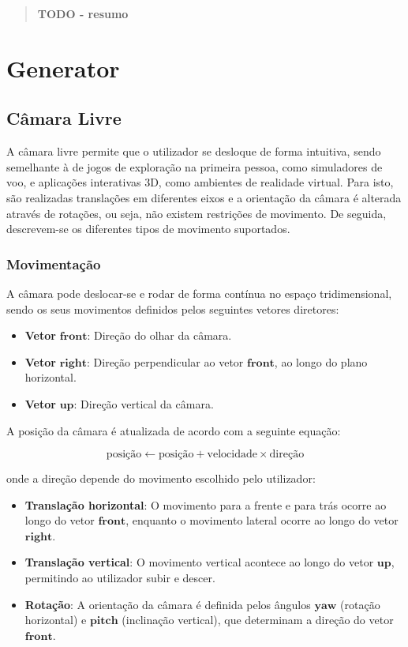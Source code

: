 \documentclass[12pt, a4paper]{article}
\begin{document}
\pagebreak

\begin{abstract}
    \textbf{\color{red} TODO - resumo}
\end{abstract}

\section{Generator}

\subsection{Câmara Livre}

A câmara livre permite que o utilizador se desloque de forma intuitiva, sendo semelhante à de
jogos de exploração na primeira pessoa, como simuladores de voo, e aplicações interativas 3D,
como ambientes de realidade virtual. Para isto, são realizadas translações em diferentes eixos
e a orientação da câmara é alterada através de rotações, ou seja, não existem restrições de
movimento.
De seguida, descrevem-se os diferentes tipos de movimento suportados.

\subsubsection{Movimentação}

A câmara pode deslocar-se e rodar de forma contínua no espaço tridimensional, sendo os seus
movimentos definidos pelos seguintes vetores diretores:

\begin{itemize}
    \item \textbf{Vetor} $\mathbf{front}$: Direção do olhar da câmara.
    \item \textbf{Vetor} $\mathbf{right}$: Direção perpendicular ao vetor $\mathbf{front}$, ao
          longo do plano horizontal.
    \item \textbf{Vetor} $\mathbf{up}$: Direção vertical da câmara.
\end{itemize}

A posição da câmara é atualizada de acordo com a seguinte equação:

\[
\text{posição} \gets \text{posição} + \text{velocidade} \times \text{direção}
\]

onde a direção depende do movimento escolhido pelo utilizador:

\begin{itemize}
    \item \textbf{Translação horizontal}: O movimento para a frente e para trás ocorre ao longo
          do vetor $\mathbf{front}$, enquanto o movimento lateral ocorre ao longo do vetor
          $\mathbf{right}$.
    \item \textbf{Translação vertical}: O movimento vertical acontece ao longo do vetor
          $\mathbf{up}$, permitindo ao utilizador subir e descer.
    \item \textbf{Rotação}: A orientação da câmara é definida pelos ângulos $\mathbf{yaw}$
          (rotação horizontal) e $\mathbf{pitch}$ (inclinação vertical), que determinam a direção
          do vetor $\mathbf{front}$.
\end{itemize}
\end{document}
